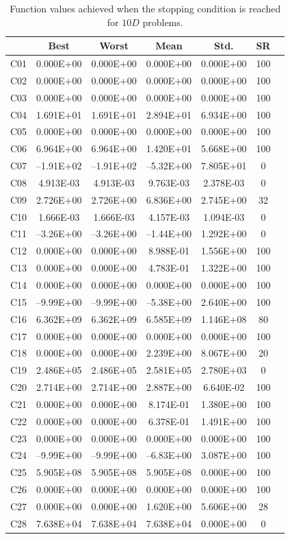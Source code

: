 \documentclass[conference]{IEEEtran}
\begin{document}
\clearpage
\begin{table}[!ht]
	\caption{Function values achieved when the stopping condition is reached for $10D$ problems.}
	\centering
	\begin{tabular}{|c|c|c|c|c|c|c|}
	\hline
     & Best & Worst & Mean & Std. & SR \\ \hline \hline
C01  & 0.000E+00 & 0.000E+00 & 0.000E+00 & 0.000E+00  & 100 \\
C02  & 0.000E+00 & 0.000E+00 & 0.000E+00 & 0.000E+00  & 100 \\
C03  & 0.000E+00 & 0.000E+00 & 0.000E+00 & 0.000E+00  & 100 \\
C04  & 1.691E+01 & 1.691E+01 & 2.894E+01 & 6.934E+00  & 100 \\
C05  & 0.000E+00 & 0.000E+00 & 0.000E+00 & 0.000E+00  & 100 \\
C06  & 6.964E+00 & 6.964E+00 & 1.420E+01 & 5.668E+00  & 100 \\
C07  &--1.91E+02 &--1.91E+02 &--5.32E+00 & 7.805E+01  & 0 \\
C08  & 4.913E-03 & 4.913E-03 & 9.763E-03 & 2.378E-03  & 0 \\
C09  & 2.726E+00 & 2.726E+00 & 6.836E+00 & 2.745E+00  & 32 \\
C10  & 1.666E-03 & 1.666E-03 & 4.157E-03 & 1.094E-03  & 0 \\
C11  &--3.26E+00 &--3.26E+00 &--1.44E+00 & 1.292E+00  & 0 \\
C12  & 0.000E+00 & 0.000E+00 & 8.988E-01 & 1.556E+00  & 100 \\
C13  & 0.000E+00 & 0.000E+00 & 4.783E-01 & 1.322E+00  & 100 \\
C14  & 0.000E+00 & 0.000E+00 & 0.000E+00 & 0.000E+00  & 100 \\
C15  &--9.99E+00 &--9.99E+00 &--5.38E+00 & 2.640E+00  & 100 \\
C16  & 6.362E+09 & 6.362E+09 & 6.585E+09 & 1.146E+08  & 80 \\
C17  & 0.000E+00 & 0.000E+00 & 0.000E+00 & 0.000E+00  & 100 \\
C18  & 0.000E+00 & 0.000E+00 & 2.239E+00 & 8.067E+00  & 20 \\
C19  & 2.486E+05 & 2.486E+05 & 2.581E+05 & 2.780E+03  & 0 \\
C20  & 2.714E+00 & 2.714E+00 & 2.887E+00 & 6.640E-02  & 100 \\
C21  & 0.000E+00 & 0.000E+00 & 8.174E-01 & 1.380E+00  & 100 \\
C22  & 0.000E+00 & 0.000E+00 & 6.378E-01 & 1.491E+00  & 100 \\
C23  & 0.000E+00 & 0.000E+00 & 0.000E+00 & 0.000E+00  & 100 \\
C24  &--9.99E+00 &--9.99E+00 &--6.83E+00 & 3.087E+00  & 100 \\
C25  & 5.905E+08 & 5.905E+08 & 5.905E+08 & 0.000E+00  & 100 \\
C26  & 0.000E+00 & 0.000E+00 & 0.000E+00 & 0.000E+00  & 100 \\
C27  & 0.000E+00 & 0.000E+00 & 1.620E+00 & 5.606E+00  & 28 \\
C28  & 7.638E+04 & 7.638E+04 & 7.638E+04 & 0.000E+00  & 0  \\
\hline
	\end{tabular}
	\label{tab:d10}
\end{table}
\end{document}
